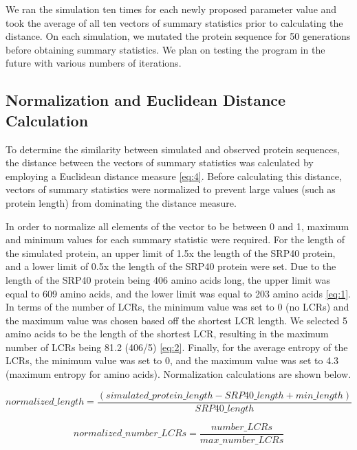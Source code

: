 \documentclass[10pt]{article}
\begin{document}
We ran the simulation ten times for each newly proposed parameter value and took the average of all ten vectors of summary statistics prior to calculating the distance. On each simulation, we mutated the protein sequence for 50 generations before obtaining summary statistics. We plan on testing the program in the future with various numbers of iterations.

\subsection{Normalization and Euclidean Distance Calculation}

To determine the similarity between simulated and observed protein sequences, the distance between the vectors of summary statistics was calculated by employing a Euclidean distance measure \eqref{eq:4}. Before calculating this distance, vectors of summary statistics were normalized to prevent large values (such as protein length) from dominating the distance measure.

In order to normalize all elements of the vector to be between 0 and 1, maximum and minimum values for each summary statistic were required. For the length of the simulated protein, an upper limit of 1.5x the length of the SRP40 protein, and a lower limit of 0.5x the length of the SRP40 protein were set. Due to the length of the SRP40 protein being 406 amino acids long, the upper limit was equal to 609 amino acids, and the lower limit was equal to 203 amino acids \eqref{eq:1}. In terms of the number of LCRs, the minimum value was set to 0 (no LCRs) and the maximum value was chosen based off the shortest LCR length. We selected 5 amino acids to be the length of the shortest LCR, resulting in the maximum number of LCRs being 81.2 (406/5) \eqref{eq:2}. Finally, for the average entropy of the LCRs, the minimum value was set to 0, and the maximum value was set to 4.3 (maximum entropy for amino acids). Normalization calculations are shown below.


\begin{equation}
	normalized\_length = \frac{(simulated\_protein\_length - SRP40\_length + min\_length)}{SRP40\_length}
	\label{eq:1}
\end{equation}

\begin{equation}
	normalized\_number\_LCRs = \frac{number\_LCRs}{max\_number\_LCRs}
	\label{eq:2}
\end{equation}
\end{document}
